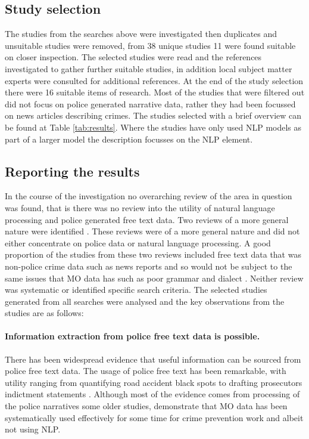 \subsection{Study selection} The studies from the searches above were investigated then duplicates and unsuitable studies were removed, from 38 unique studies 11 were found suitable on closer inspection. The selected studies were read and the references investigated to gather further suitable studies, in addition local subject matter experts were consulted for additional references. At the end of the study selection there were 16 suitable items of research. Most of the studies that were filtered out did not focus on police generated narrative data, rather they had been focussed on news articles describing crimes. The studies selected with a brief overview can be found at Table \ref{tab:results}. Where the studies have only used NLP models as part of a larger model the description focusses on the NLP element.

\subsection{Reporting the results}

In the course of the investigation no overarching review of the area in question was found, that is there was no review into the utility of natural language processing and police generated free text data. Two reviews of a more general nature were identified \parencite{krishnamurthy2012survey, hassani2016review}. These reviews were of a more general nature and  did not either concentrate on police data or natural language processing. A good proportion of the studies from these two reviews included free text data that was non-police crime data such as news reports and so would not be subject to the same issues that MO data has such as poor grammar and dialect \parencite{Keyvanpour2011872}. Neither review was systematic or identified specific search criteria. The selected studies generated from all searches were analysed and the key observations from the studies are as follows:


\paragraph{Information extraction from police free text data is possible.} There has been widespread evidence that useful information can be sourced from police free text data. The usage of police free text has been remarkable, with utility ranging from quantifying road accident black spots \textcite{Krause2019} to drafting prosecutors indictment statements \parencite{chen2010use}. Although most of the evidence comes from processing of the police narratives some older studies, demonstrate that MO data has been systematically used effectively for some time for crime prevention work \textcite{bowers2004commits} and \parencite{adderley2003modus} albeit not using NLP. 


